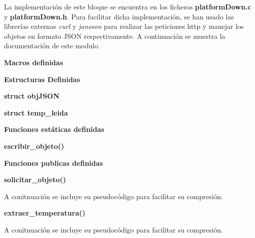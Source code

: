 	La implementación de este bloque se encuentra en los ficheros \textbf{platformDown.c} y \textbf{platformDown.h}. Para facilitar dicha implementación, se han usado las librerías externas \textit{curl} \cite{curl} y \textit{jansson} \cite{jansson} para realizar las peticiones http y manejar los objetos en formato JSON respectivamente. A continuación se muestra la documentación de este modulo.

\noindent\Large\textbf{Macros definidas}\label{adquisición:macros}



\noindent\Large\textbf{Estructuras Definidas}\label{adquisición:estructuras}

\normalsize\textbf{struct objJSON}\label{estructuraobjJSON}


\normalsize\textbf{struct temp\_leida}\label{estructuratempLeida}


\noindent\Large\textbf{Funciones estáticas definidas}\label{adquisicion:functEstaticas}

\normalsize\textbf{escribir\_objeto()}\label{adquisicion:escribirObjeto}



\noindent\Large\textbf{Funciones publicas definidas}\label{adquisicion:funPublicas}

\normalsize\textbf{solicitar\_objeto()}\label{adquisicion:solicitarObjeto}



A conitnuación se incluye su pseudocódigo para facilitar su compresión.



\normalsize\textbf{extraer\_temperatura()}\label{adquisicion:extraerTemperatura}



A conitnuación se incluye su pseudocódigo para facilitar su compresión.



